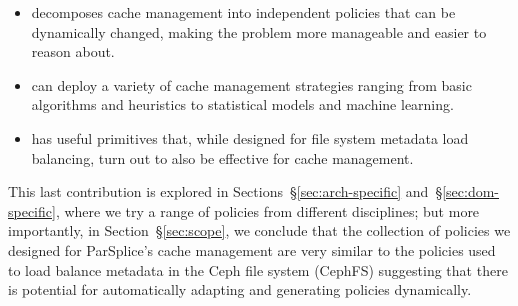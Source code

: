 \begin{itemize}

  \item decomposes cache management into independent policies that can be
  dynamically changed, making the problem more manageable and easier to reason
  about.

  \item can deploy a variety of cache management strategies ranging from basic
  algorithms and heuristics to statistical models and machine learning.

  \item has useful primitives that, while designed for file system metadata
  load balancing, turn out to also be effective for cache management. 

\end{itemize}


This last contribution is explored in Sections~\S\ref{sec:arch-specific}
and~\S\ref{sec:dom-specific}, where we try a range of policies from different
disciplines; but more importantly, in Section~\S\ref{sec:scope}, we conclude
that the collection of policies we designed for ParSplice's cache management
are very similar to the policies used to load balance metadata in the Ceph file
system (CephFS) suggesting that there is potential for automatically adapting
and generating policies dynamically.  


